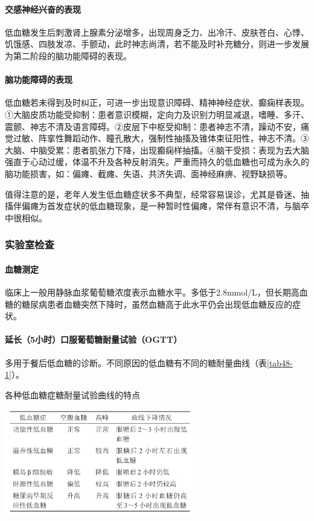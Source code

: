 \paragraph{交感神经兴奋的表现}

低血糖发生后刺激肾上腺素分泌增多，出现周身乏力、出冷汗、皮肤苍白、心悸、饥饿感、四肢发凉、手颤动，此时神志尚清，若不能及时补充糖分，则进一步发展为第二阶段的脑功能障碍的表现。

\paragraph{脑功能障碍的表现}

低血糖若未得到及时纠正，可进一步出现意识障碍、精神神经症状、癫痫样表现。①大脑皮质功能受抑制：患者意识模糊，定向力及识别力明显减退，嗜睡、多汗、震颤、神志不清及语言障碍。②皮层下中枢受抑制：患者神志不清，躁动不安，痛觉过敏、阵挛性舞蹈动作、瞳孔散大，强制性抽搐及锥体束征阳性，神志不清。③大脑、中脑受累：患者肌张力下降，出现癫痫样抽搐。④脑干受损：表现为去大脑强直于心动过缓，体温不升及各种反射消失。严重而持久的低血糖也可成为永久的脑功能损害，如：偏瘫、截瘫、失语、共济失调、面神经麻痹、视野缺损等。

值得注意的是，老年人发生低血糖症状多不典型，经常容易误诊，尤其是昏迷、抽搐伴偏瘫为首发症状的低血糖现象，是一种暂时性偏瘫，常伴有意识不清，与脑卒中很相似。

\subsubsection{实验室检查}

\paragraph{血糖测定}

临床上一般用静脉血浆葡萄糖浓度表示血糖水平。多低于2.8mmol/L，但长期高血糖的糖尿病患者血糖突然下降时，虽然血糖高于此水平仍会出现低血糖反应的症状。

\paragraph{延长（5小时）口服葡萄糖耐量试验（OGTT）}

多用于餐后低血糖的诊断。不同原因的低血糖有不同的糖耐量曲线（表\ref{tab48-1}）。

\begin{table}[htbp]
\centering
\caption{各种低血糖症糖耐量试验曲线的特点}
\label{tab48-1}
\includegraphics[width=3.27083in,height=1.84375in]{./images/Image00164.jpg}
\end{table}

